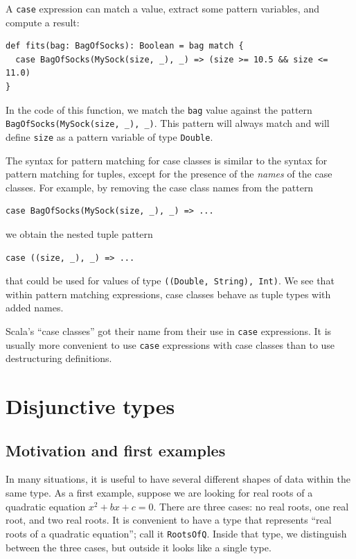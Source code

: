 A \lstinline!case! expression can match a value, extract some pattern
variables, and compute a result:
\begin{lstlisting}
def fits(bag: BagOfSocks): Boolean = bag match {
  case BagOfSocks(MySock(size, _), _) => (size >= 10.5 && size <= 11.0)
}
\end{lstlisting}
In the code of this function, we match the \lstinline!bag! value
against the pattern \lstinline!BagOfSocks(MySock(size, _), _)!. This
pattern will always match and will define \lstinline!size! as a pattern
variable of type \lstinline!Double!.

The syntax for pattern matching for case classes is similar to the
syntax for pattern matching for tuples, except for the presence of
the \emph{names} of the case classes. For example, by removing the
case class names from the pattern
\begin{lstlisting}
case BagOfSocks(MySock(size, _), _) => ...
\end{lstlisting}
we obtain the nested tuple pattern 
\begin{lstlisting}
case ((size, _), _) => ...
\end{lstlisting}
that could be used for values of type \lstinline!((Double, String), Int)!.
We see that within pattern matching expressions, case classes behave
as tuple types with added names. 

Scala's ``case classes'' got their name from their use in \lstinline!case!
expressions. It is usually more convenient to use \lstinline!case!
expressions with case classes than to use destructuring definitions.

\section{Disjunctive types}

\subsection{Motivation and first examples\label{subsec:Disjunctive-Motivation-and-first-examples}}

In many situations, it is useful to have several different shapes
of data within the same type. As a first example, suppose we are looking
for real roots of a quadratic equation $x^{2}+bx+c=0$. There are
three cases: no real roots, one real root, and two real roots. It
is convenient to have a type that represents ``real roots of a quadratic
equation''; call it \lstinline!RootsOfQ!. Inside that type, we distinguish
between the three cases, but outside it looks like a single type.


